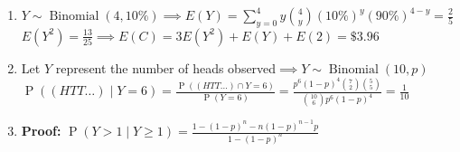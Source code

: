 \documentclass{article}
\newcommand{\proof}[1]{\textbf{Proof: #1}}
\newcommand{\pr}[1]{\operatorname{P}(#1)}
\newcommand{\binomdist}[3]{#1 \sim \operatorname{Binomial}(#2, #3)}
\begin{document}
\begin{enumerate}
  \item $\binomdist{Y}{4}{10\%} \implies E(Y) = \sum_{y=0}^{4}y\binom{4}{y}(10\%)^y(90\%)^{4-y} = \frac{2}{5}$\\
  $E(Y^2) = \frac{13}{25} \implies E(C) = 3E(Y^2)+E(Y)+E(2) = \$3.96$

  \item Let $Y$ represent the number of heads observed$\implies \binomdist{Y}{10}{p}$\\
  $\pr{(HTT\ldots) \mid Y = 6} = 
  \frac{\pr{(HTT\ldots) \cap Y=6}}{\pr{Y=6}} 
  = \frac{p^6(1-p)^4\binom{7}{2}\binom{5}{5}}{\binom{10}{6}p^6(1-p)^4} 
  = \frac{1}{10}$

  \item \proof{}$\pr{Y>1 \mid Y\geq 1} = \frac{1-(1-p)^n-n(1-p)^{n-1}p}{1-(1-p)^n}$
\end{enumerate}
\end{document}
